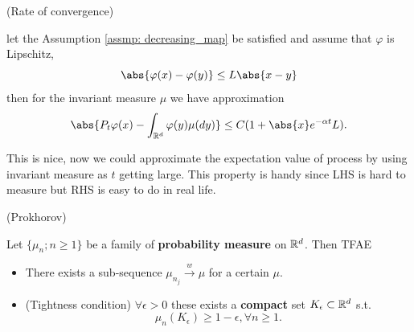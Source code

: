 \begin{thm}{(Rate of convergence)}

let the Assumption \ref{assmp: decreasing_map} be satisfied and assume that $\varphi$ is Lipschitz,
\begin{equation*}
    \abs{\varphi(x) - \varphi(y)} \leq L\abs{x-y} 
\end{equation*}then for the invariant measure $\mu$ we have approximation
\begin{equation*}
    \abs{P_t \varphi(x) - \int_{\R^d} \varphi(y) \mu(\diff y)} \leq C(1+\abs{x} e^{-\alpha t} L).
\end{equation*}
\end{thm}
This is nice, now we could approximate the expectation value of process by using invariant measure as $t$ getting large. This property is handy since LHS is hard to measure but RHS is easy to do in real life.

\begin{thm}{(Prokhorov)}\label{thm: prokhorov}

Let $\{\mu_n; n\geq 1\}$ be a family of \textbf{probability measure} on $\mathbb{R}^d$. Then TFAE
\begin{itemize}
    \item There exists a sub-sequence $\mu_{n_{j}} \xrightarrow{w} \mu$ for a certain $\mu$.
    \item (Tightness condition) $\forall \epsilon >0$ these exists a \textbf{compact} set $K_\epsilon \subset \mathbb{R}^d$ s.t. 
    \begin{equation*}
        \mu_n(K_\epsilon) \geq 1-\epsilon, \forall n \geq 1.
    \end{equation*}
\end{itemize}
\end{thm}

